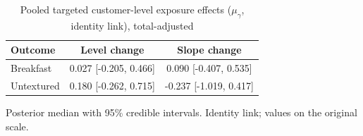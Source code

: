\begin{table}[H]
\centering
\caption{Pooled targeted customer-level exposure effects ($\mu_\gamma$, identity link), total-adjusted}
\label{tab:a6_mu_gamma_adj}
\begin{tabular}{lcc}
\toprule
Outcome & Level change & Slope change \\
\midrule
Breakfast & 0.027 [-0.205, 0.466] & 0.090 [-0.407, 0.535] \\
Untextured & 0.180 [-0.262, 0.715] & -0.237 [-1.019, 0.417] \\
\bottomrule
\end{tabular}
\par\smallskip\footnotesize Posterior median with 95\% credible intervals. Identity link; values on the original scale.
\end{table}

